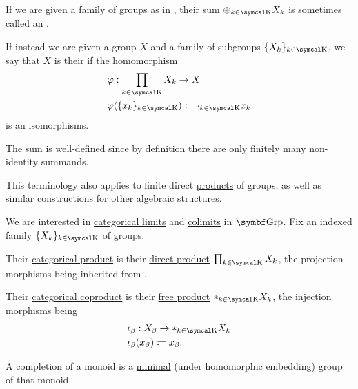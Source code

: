 \begin{Remark}\label{def:group_direct_sum_external_internal}\cite[126]{Knapp2016BAlg}
  If we are given a family of groups as in , their sum \( \oplus_{k \in \CK} X_k \) is sometimes called an .

  If instead we are given a group \( X \) and a family of subgroups \( \{ X_k \}_{k \in \CK} \), we say that \( X \) is their  if the homomorphism
  \begin{align*}
    &\varphi: \prod_{k \in \CK} X_k \to X \\
    &\varphi(\{ x_k \}_{k \in \CK}) \coloneqq \cdot_{k \in \CK} x_k
  \end{align*}
  is an isomorphisms.

  The sum is well-defined since by definition there are only finitely many non-identity summands.

  This terminology also applies to finite direct \hyperref[def:group_direct_product]{products} of groups, as well as similar constructions for other algebraic structures.
\end{Remark}

\begin{Proposition}\label{thm:group_categorical_limits}
  We are interested in \hyperref[def:categorical_limit]{categorical limits} and \hyperref[def:categorical_colimit]{colimits} in \( \Cat{Grp} \). Fix an indexed family  \( \{ X_k \}_{k \in \CK} \) of groups.
  \begin{DefEnum}
     Their \hyperref[def:categorical_product]{categorical product} is their \hyperref[def:group_direct_product]{direct product} \( \prod_{k \in \CK} X_k \), the projection morphisms being inherited from .

     Their \hyperref[def:categorical_coproduct]{categorical coproduct} is their \hyperref[def:group_free_product]{free product} \( \ast_{k \in \CK} X_k \), the injection morphisms being
    \begin{align*}
      &\iota_\beta: X_\beta \to \ast_{k \in \CK} X_k \\
      &\iota_\beta(x_\beta) \coloneqq x_\beta.
    \end{align*}
  \end{DefEnum}
\end{Proposition}

\begin{Definition}\label{def:monoid_completion}
  A completion of a monoid is a \hyperref[def:preordered_set/maximal_minimal_element]{minimal} (under homomorphic embedding) group of that monoid.
\end{Definition}


